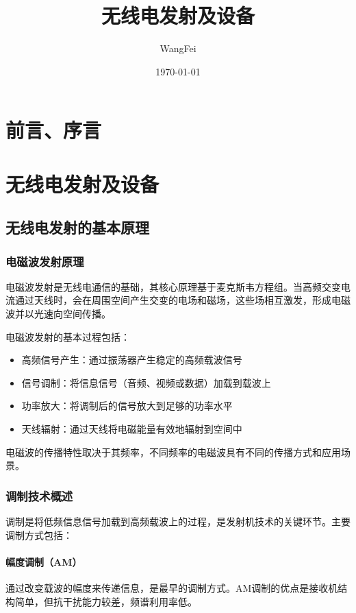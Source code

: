 \documentclass[12pt,UTF8]{ctexbook}
\title{\heiti\zihao{0} 无线电发射及设备}
\author{WangFei}
\date{\today}
\begin{document}
\maketitle
\tableofcontents

\frontmatter
\chapter{前言、序言}

\mainmatter

\chapter{无线电发射及设备}

\section{无线电发射的基本原理}

\subsection{电磁波发射原理}

电磁波发射是无线电通信的基础，其核心原理基于麦克斯韦方程组。当高频交变电流通过天线时，会在周围空间产生交变的电场和磁场，这些场相互激发，形成电磁波并以光速向空间传播。

电磁波发射的基本过程包括：
\begin{itemize}[leftmargin=3.5em]
    \item 高频信号产生：通过振荡器产生稳定的高频载波信号
    \item 信号调制：将信息信号（音频、视频或数据）加载到载波上
    \item 功率放大：将调制后的信号放大到足够的功率水平
    \item 天线辐射：通过天线将电磁能量有效地辐射到空间中
\end{itemize}

电磁波的传播特性取决于其频率，不同频率的电磁波具有不同的传播方式和应用场景。

\subsection{调制技术概述}

调制是将低频信息信号加载到高频载波上的过程，是发射机技术的关键环节。主要调制方式包括：

\subsubsection{幅度调制（AM）}
通过改变载波的幅度来传递信息，是最早的调制方式。AM调制的优点是接收机结构简单，但抗干扰能力较差，频谱利用率低。
\end{document}
